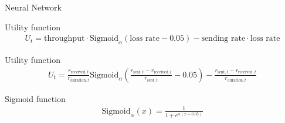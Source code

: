 \documentclass[11pt]{beamer}
\begin{document}
\begin{frame}{Neural Network}



\end{frame}

\makeatletter
{}
\makeatother

\begin{frame}{Utility function}
\begin{align*}
U_t = \text{throughput} \cdot \text{Sigmoid}_\alpha\left(\text{loss rate} - 0.05 \right) - \text{sending rate}\cdot\text{loss rate}
\end{align*}
\end{frame}

\begin{frame}{Utility function}
\begin{align*}
U_t = \frac{r_{\text{received},t}}{r_{\text{duration},t}}\text{Sigmoid}_\alpha\left(\frac{r_{\text{sent},t} - r_{\text{received},t}}{r_{\text{sent},t}} - 0.05\right) - \frac{r_{\text{sent},t} - r_{\text{received},t}}{r_{\text{duration},t}}
\end{align*}
\end{frame}

\begin{frame}{Sigmoid function}
\begin{align*}
\text{Sigmoid}_\alpha(x) = \frac{1}{1+e^{\alpha (x-0.05)}}
\end{align*}
\end{frame}
\end{document}

